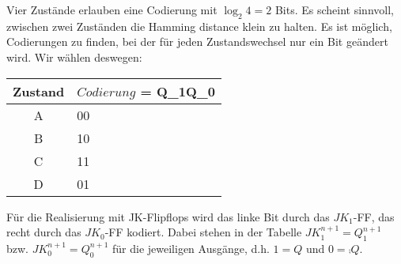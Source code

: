 \documentclass{CInf_practice}
\begin{document}
Vier Zustände erlauben eine Codierung mit $\log_2{4}=2$ Bits. Es scheint sinnvoll, zwischen zwei Zuständen die Hamming distance klein zu halten. Es ist möglich, Codierungen zu finden, bei der für jeden Zustandswechsel nur ein Bit geändert wird. Wir wählen deswegen:

\begin{tabular}{c|m}
Zustand & $Codierung $ = Q_1Q_0 \\\hline
A & 00 \\
B & 10 \\
C & 11 \\
D & 01 \\
\end{tabular}

Für die Realisierung mit JK-Flipflops wird das linke Bit durch das $JK_1$-FF, das recht durch das $JK_0$-FF kodiert. Dabei stehen in der Tabelle $JK_1^{n+1} = Q_1^{n+1}$ bzw. $JK_0^{n+1} = Q_0^{n+1}$ für die jeweiligen Ausgänge, d.h. $1 = Q$ und $0 = \comp Q$.
\end{document}
